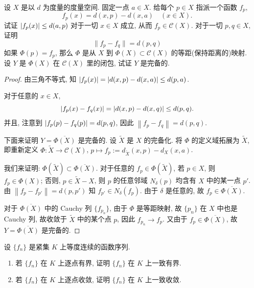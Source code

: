 \documentclass{article}
\begin{document}
\begin{problem}[7-24]
设 $X$ 是以 $d$ 为度量的度量空间. 固定一点 $a \in X$. 给每个 $p \in X$ 指派一个函数 $f_p$,
\[
f_p(x) = d(x, p) - d(x, a) \quad (x \in X).
\]
试证 $\left|f_p(x)\right| \le d(a, p)$ 对于一切 $x \in X$ 成立, 从而 $f_p \in \mathscr{C}(X)$. 对于一切 $p, q \in X$, 证明
\[
\lVert f_p - f_q \rVert = d(p, q)
\]
如果 $\Phi(p) = f_p$, 那么 $\Phi$ 是从 $X$ 到 $\Phi(X) \subset \mathscr{C}(X)$ 的等距(保持距离的)映射. 设 $Y$ 是 $\Phi(X)$ 在 $\mathscr{C}(X)$ 里的闭包, 试证 $Y$ 是完备的.
\end{problem}

\begin{proof}
  由三角不等式, 知 \( \left|f_p(x)\right| = \left|d(x,p)-d(x,a)\right| \le d(p,a) \).

  对于任意的 \( x\in X \), 
  \[ \left|f_p(x)-f_q(x)\right| = \left|d(x,p)-d(x,q)\right| \le d(p,q). \]
  并且, 注意到 \( \left|f_p(p)-f_q(p)\right| = d(p,q) \), 因此 \( \left\|f_p-f_q\right\|=d(p,q) \).

  下面来证明 \( Y=\overline{\Phi(X)} \) 是完备的. 设 \( \tilde{X} \) 是 \( X \) 的完备化. 将 \( \Phi \) 的定义域拓展为 \( \tilde{X} \), 即重新定义 \( \Phi: \tilde{X} \to \mathscr{C}(X) \), \( p\mapsto f_p:=d_{\tilde{X}}(x,p)-d_X(x,a) \).

  我们来证明: \( \Phi(\tilde{X}) \subset \overline{\Phi(X)} \). 对于任意的 \( f_p\in \Phi(\tilde{X}) \), 若 \( p\in X \), 则 \( f_p\in\Phi(X) \); 否则, \( p\in \tilde{X}-X \), 则 \( p \) 的任意邻域 \( N_\delta(p) \) 均含有 \( X \) 中的某一点 \( p' \). 由 \( \left\|f_p-f_{p'}\right\|=d(p,p') \) 知 \( f_{p'}\in N_{\delta}(f_p) \). 由于 \( \delta \) 是任意的, 故 \( f_p\in\overline{\Phi(X)} \).

  对于 \( \overline{\Phi(X)} \) 中的 Cauchy 列 \( \{f_{p_n}\} \), 由于 \( \Phi \) 是等距映射, 故 \( \{p_n\} \) 在 \( X \) 中也是 Cauchy 列, 故收敛于 \( \tilde{X} \) 中的某个点 \( p \), 因此 \( f_{p_n} \to f_p \). 又由于 \( f_p \in \overline{\Phi(X)} \), 故 \( Y=\overline{\Phi(X)} \) 是完备的.
\end{proof}



\begin{problem}
  设 \( \{f_n\} \) 是紧集 \( K \) 上等度连续的函数序列. 
  \begin{enumerate}[label=(\alph*)]
    \item 若 \( \{f_n\} \) 在 \( K \) 上逐点有界, 证明 \( \{f_n\} \) 在 \( K \) 上一致有界.
    \item 若 \( \{f_n\} \) 在 \( K \) 上逐点收敛, 证明 \( \{f_n\} \) 在 \( K \) 上一致收敛.
  \end{enumerate}
\end{problem}
\end{document}
